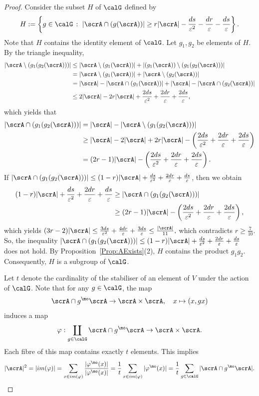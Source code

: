 \begin{proof}
Consider the subset $H$ of $\calG$ defined by
$$H  :=
\left\{
g\in \calG \,:\,\, |\scrA \cap  (g(\scrA))| \geq r|\scrA| - \frac{ds}{\varepsilon^2} 
- \frac{dr}{\varepsilon}
- \frac{ds}{\varepsilon}
\right\}.$$
Note that $H$ contains the identity element of $\calG$. Let $g_1, g_2$ be elements of $H$. By the triangle inequality, 
\begin{align*}
|\scrA \setminus (g_1(g_2(\scrA)))| 
& \leq |\scrA \setminus (g_1(\scrA)) | + |(g_1(\scrA)) \setminus (g_1(g_2(\scrA)))| \\
& =  |\scrA \setminus  (g_1(\scrA)) | + |\scrA  \setminus (g_2(\scrA)) |\\
& = |\scrA | -  |\scrA \cap (g_1(\scrA))  | + |\scrA | - |\scrA  \cap (g_2(\scrA)) |\\
& \leq 2|\scrA| - 2r |\scrA| + \frac{2ds}{\varepsilon^2}  + \frac{2dr}{\varepsilon} 
+\frac{2ds}{\varepsilon} ,
\end{align*}
which yields that  
\begin{align*}
|\scrA \cap (g_1(g_2(\scrA)))| 
& = |\scrA | - |\scrA \setminus (g_1(g_2(\scrA)))| \\
& \geq |\scrA | - 2|\scrA| + 2r |\scrA| - \left(\frac{2ds}{\varepsilon^2} +\frac{2dr}{\varepsilon} + \frac{2ds}{\varepsilon} \right)\\
& = (2r - 1) |\scrA| - \left(\frac{2ds}{\varepsilon^2} + \frac{2dr}{\varepsilon} +\frac{2ds}{\varepsilon} \right).
\end{align*}
If $|\scrA \cap (g_1(g_2(\scrA)))| \leq (1-r) |\scrA| + \frac{ds}{\varepsilon^2} + \frac{2dr}\varepsilon +\frac{ds}{\varepsilon}$, then we obtain 
\begin{align*}
(1-r) |\scrA| + \frac{ds}{\varepsilon^2} + \frac{2dr}\varepsilon + \frac{ds}{\varepsilon}
&\geq |\scrA \cap (g_1(g_2(\scrA)))| \\
&\geq  (2r - 1) |\scrA| - \left(\frac{2ds}{\varepsilon^2} + \frac{2dr}{\varepsilon} + \frac{2ds}{\varepsilon} \right),
\end{align*}
which yields
$(3r-2)
|\scrA| 
\leq \frac{3ds}{\varepsilon^2} + \frac{4dr}{\varepsilon} + \frac{3ds}{\varepsilon} 
\leq \frac {|\scrA|}{ 11},
$
which contradicts $ r \geq \frac 7{10}$. 
So, the inequality 
$|\scrA \cap (g_1(g_2(\scrA)))| \leq (1-r) |\scrA|
+ \frac{ds}{\varepsilon^2} + \frac{2dr}\varepsilon + \frac{ds}{\varepsilon}$
does not hold. By Proposition~\ref{Prop:AExists}(2), $H$ contains the product $g_1g_2$. Consequently, $H$ is a subgroup of $\calG$. 

Let $t$ denote the cardinality of the stabiliser of an element of $V$ under the action of $\calG$. Note that for any $g\in \calG$, the map
$$\scrA\cap g^\mo \scrA \to \scrA\times \scrA, \quad 
x\mapsto (x, gx)$$ 
induces a map 
$$\varphi: \coprod _{g\in \calG} \scrA\cap g^\mo \scrA \to \scrA\times \scrA.$$
Each fibre of this map contains exactly $t$ elements. This implies 
$$
|\scrA|^2
= |im(\varphi)|
= \sum_{x\in im(\varphi) } \frac{|\varphi^\mo (x)|} {|\varphi^\mo (x)|}
= \frac 1t \sum_{x\in im(\varphi)} |\varphi^\mo (x)|
= \frac 1t \sum_{g\in \calG} |\scrA\cap g^\mo \scrA|.$$


\end{proof}
